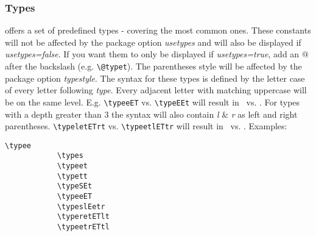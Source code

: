 \documentclass[10pt, a4paper]{article}
\begin{document}
	\subsubsection{Types}
	\texttt{} offers a set of predefined types - covering the most common ones. These constants will not be affected by the package option \textit{usetypes} and will also be displayed if \textit{usetypes=false}. If you want them to only be displayed if \textit{usetypes=true}, add an @ after the backslash (e.g. \verb=\@typet=). The parentheses style will be affected by the package option \textit{typestyle}. The syntax for these types is defined by the letter case of every letter following \textit{type}. Every adjacent letter with matching uppercase will be on the same level. E.g. \verb=\typeeET= vs. \verb=\typeEEt= will result in \typeeET\ vs. \typeEEt. For types with a depth greater than 3 the syntax will also contain \textit{l} \& \textit{r} as left and right parentheses. \verb=\typeletETrt= vs. \verb=\typeetlETtr= will result in \typeretETlt\ vs. \typeetrETtl. Examples:
	\begin{center}
		\begin{minipage}[h][3.8cm][t]{15em}
			\begin{lstlisting}[style=B]
			\typee
			\types
			\typeet
			\typett
			\typeSEt
			\typeeET
			\typeslEetr
			\typeretETlt
			\typeetrETtl
			\end{lstlisting}
		\end{minipage}
		\begin{minipage}[h][3.8cm][t]{15em}
			\ \\\typee\\
			\types\\
			\typeet\\
			\typett\\
			\typeSEt\\
			\typeeET\\
			\typesleETr\\
			\typeretETlt\\
			\typeetrETtl
		\end{minipage}
	\end{center}
\end{document}
